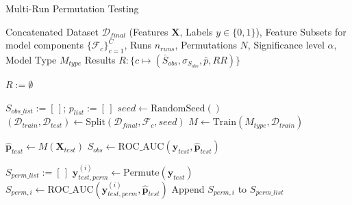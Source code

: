 \begin{algorithm}[H]
  \caption[Permutation Testing]{Multi-Run Permutation Testing}
  \label{alg:permutation_testing_symbolic}
  \begin{algorithmic}[1]
    \footnotesize %

    \Require %
    \Statex \hspace{\algorithmicindent} Concatenated Dataset $\mathcal{D}_{final}$ (Features $\mathbf{X}$, Labels $y \in \{0,1\}$),
    \Statex \hspace{\algorithmicindent} Feature Subsets for model components $\{\mathcal{F}_c\}_{c=1}^C$,
    \Statex \hspace{\algorithmicindent} Runs $n_{runs}$, Permutations $N$, Significance level $\alpha$, Model Type $M_{type}$ 
    \Ensure %
    \Statex \hspace{\algorithmicindent} Results $R : \{c \mapsto (\bar{S}_{obs}, \sigma_{S_{obs}}, \bar{p}, RR)\}$ 
    \medskip

    \State $R := \emptyset$ 
    \medskip

    \State $S_{obs\_list} := [\,]$; $p_{list} := [\,]$ 
    \medskip
    \State $seed \leftarrow \text{RandomSeed}()$
    \State $(\mathcal{D}_{train}, \mathcal{D}_{test}) \leftarrow \text{Split}(\mathcal{D}_{final}, \mathcal{F}_c, seed)$ 
    \State $M \leftarrow \text{Train}(M_{type}, \mathcal{D}_{train})$ 
    \medskip

    \State $\hat{\mathbf{p}}_{test} \leftarrow M(\mathbf{X}_{test})$ 
    \State $S_{obs} \leftarrow \text{ROC\_AUC}(\mathbf{y}_{test}, \hat{\mathbf{p}}_{test})$ 
    \medskip

    \State $S_{perm\_list} := [\,]$
    \State $\mathbf{y}_{test, perm}^{(i)} \leftarrow \text{Permute}(\mathbf{y}_{test})$ 
    \State $S_{perm, i} \leftarrow \text{ROC\_AUC}(\mathbf{y}_{test, perm}^{(i)}, \hat{\mathbf{p}}_{test})$ 
    \State Append $S_{perm, i}$ to $S_{perm\_list}$
    \EndFor
    \medskip


\end{algorithmic}
\end{algorithm}
